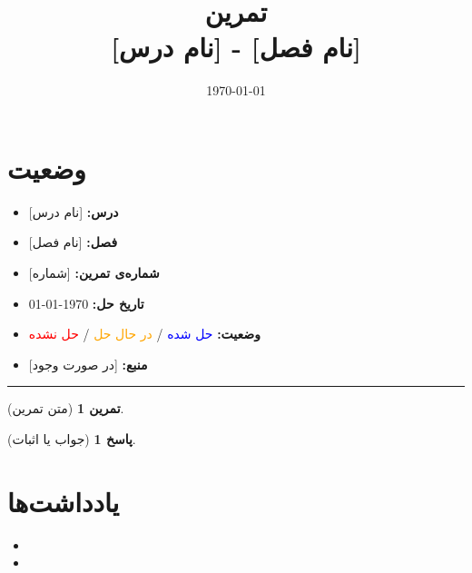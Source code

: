 \documentclass[a4paper,12pt]{article}
\title{%
	\Huge \textbf{تمرین} \\[0.3cm]
	\Large [نام درس] - [نام فصل]
}
\author{\lr{Ali Ashouri}}
\date{\today}
\theoremstyle{plain}
\newtheorem{exercise}{تمرین}
\newtheorem{solution}{پاسخ}
\begin{document}
	
	\maketitle
	
	\section*{وضعیت}
	\begin{itemize}
		\item \textbf{درس:} [نام درس]
		\item \textbf{فصل:} [نام فصل]
		\item \textbf{شماره‌ی تمرین:} [شماره]
		\item \textbf{تاریخ حل:} \today
		\item \textbf{وضعیت:} \textcolor{blue}{حل شده} / \textcolor{orange}{در حال حل} / \textcolor{red}{حل نشده}
		\item \textbf{منبع:} [در صورت وجود]
	\end{itemize}
	\rule{\textwidth}{0.4pt}
	
	\begin{exercise}
		[متن تمرین]
	\end{exercise}
	
	\begin{solution}
		[جواب یا اثبات]
	\end{solution}
	
	\section*{یادداشت‌ها}
	\begin{itemize}
		\item [یادداشت اول]
		\item [یادداشت دوم]
	\end{itemize}
	
\end{document}
